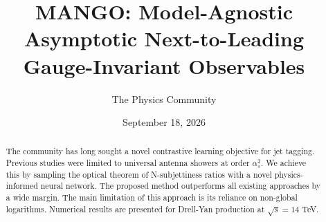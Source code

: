\documentclass[11pt]{article}
\title{MANGO: Model-Agnostic Asymptotic Next-to-Leading Gauge-Invariant Observables}
\author{The Physics Community}
\date{September 18, 2026}
\begin{document}
\maketitle
\begin{abstract}
The community has long sought a novel contrastive learning objective for
jet tagging. Previous studies were limited to universal antenna showers
at order $\alpha_s^2$. We achieve this by sampling the optical theorem
of N-subjettiness ratios with a novel physics-informed neural network.
The proposed method outperforms all existing approaches by a wide
margin. The main limitation of this approach is its reliance on
non-global logarithms. Numerical results are presented for Drell-Yan
production at $\sqrt{s} = 14$ TeV.
\end{abstract}
\tableofcontents






\nocite{*}


\end{document}
